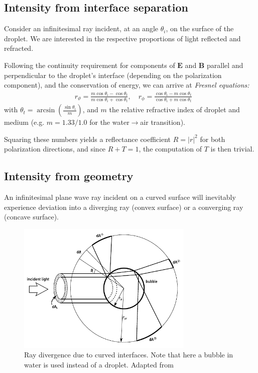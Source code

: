 \documentclass[11.5pt]{book}
\begin{document}
\subsection{Intensity from interface separation}
Consider an infinitesimal ray incident, at an angle $\theta_i$, on the surface
of the droplet. We are interested in the respective proportions of light
reflected and refracted.

Following the continuity requirement for components of $\mathbf{E}$ and
$\mathbf{B}$ parallel and perpendicular to the droplet's interface (depending on
the polarization component), and the conservation of energy, we can arrive at
\emph{Fresnel equations:}
\begin{align}
    \label{eq:fresnelequations}
    &r_\vartheta = \frac{m \cos \theta_i - \cos \theta_t}{m \cos \theta_i +
\cos \theta_t},\quad
r_\phi = \frac{\cos \theta_i - m \cos \theta_t}{\cos \theta_i +
m \cos \theta_t}
\end{align}
with $\theta_t = \arcsin\left(\frac{\sin \theta_i}{m}\right)$, and $m$ the
relative refractive index of droplet and medium (e.g. $m = 1.33/1.0$ for the
water$\rightarrow$air transition).

Squaring these numbers yields a reflectance coefficient $R = |r|^2$ for both
polarization directions, and since $R + T = 1$, the computation of $T$ is
then trivial.

\subsection{Intensity from geometry}
An infinitesimal plane wave ray incident on a curved surface will inevitably
experience deviation into a diverging ray (convex surface) or a converging ray
(concave surface).

\begin{figure}
\centering
\includegraphics[width=0.75\textwidth]{img/scattering/scatterintensity.pdf}
\caption{Ray divergence due to curved interfaces. Note that here a bubble in
water is used instead of a droplet. Adapted from \citet{Albrecht03}}
\label{fig:scatterintensity}
\end{figure}
\end{document}
